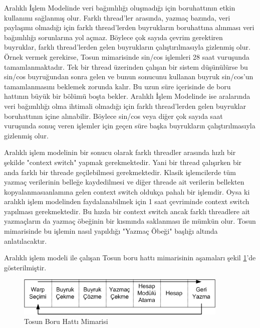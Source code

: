 Aralıklı İşlem Modelinde veri bağımlılığı oluşmadığı için boruhattının etkin kullanımı sağlanmış olur. Farklı thread’ler arasında, yazmaç bazında, veri paylaşımı olmadığı için farklı thread’lerden buyrukların boruhattına alınması veri bağımlılığı sorunlarına yol açmaz. Böylece çok sayıda çevrim gerektiren buyruklar, farklı thread’lerden gelen buyrukların çalıştırılmasıyla gizlenmiş olur. Örnek vermek gerekirse, Tosun mimarisinde sin/cos işlemleri 28 saat vuruşunda tamamlanmaktadır. Tek bir thread üzerinden çalışan bir sistem düşünülürse bu sin/cos buyruğundan sonra gelen ve bunun sonucunu kullanan buyruk sin/cos’un tamamlanmasını beklemek zorunda kalır. Bu uzun süre içerisinde de boru hattının büyük bir bölümü boşta bekler. Aralıklı İşlem Modelinde ise aralarında veri bağımlılığı olma ihtimali olmadığı için farklı thread’lerden gelen buyruklar boruhattının içine alınabilir. Böylece sin/cos veya diğer çok sayıda saat vuruşunda sonuç veren işlemler için geçen süre başka buyrukların çalıştırılmasıyla gizlenmiş olur.\par

Aralıklı işlem modelinin bir sonucu olarak farklı threadler arasında hızlı bir şekilde "context switch" yapmak gerekmektedir. Yani bir thread çalışırken bir anda farklı bir threade geçilebilmesi gerekmektedir. Klasik işlemcilerde tüm yazmaç verilerinin belleğe kaydedilmesi ve diğer threade ait verilerin bellekten kopyalanmasıanlamına gelen context switch oldukça pahalı bir işlemdir. Oysa ki aralıklı işlem modelinden faydalanabilmek için 1 saat çevriminde context switch yapılması gerekmektedir. Bu hızda bir context switch ancak farklı threadlere ait yazmaçların da yazmaç öbeğinin bir kısmında saklanması ile mümkün olur. Tosun mimarisinde bu işlemin nasıl yapıldığı "Yazmaç Öbeği" başlığı altında anlatılacaktır.\par

Aralıklı işlem modeli ile çalışan Tosun boru hattı mimarisinin aşamaları şekil \ref{image:pipelineStages}'de gösterilmiştir.

\begin{figure}[h]
\centering
\shorthandoff{=}
\includegraphics[width=0.9\textwidth]{gorsel/pipelineStages.png}
\shorthandoff{=}
\caption{Tosun Boru Hattı Mimarisi}
\label{image:pipelineStages}
\end{figure}

